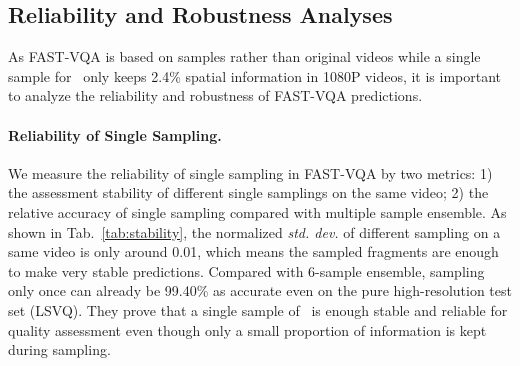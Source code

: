 \documentclass[runningheads]{llncs}
\begin{document}
\subsection{Reliability and Robustness Analyses}

As FAST-VQA is based on samples rather than original videos while a single sample for \frag~only keeps 2.4\% spatial information in 1080P videos, it is important to analyze the reliability and robustness of FAST-VQA predictions.

\paragraph{Reliability of Single Sampling.} We measure the reliability of single sampling in FAST-VQA by two metrics: 1) the assessment stability of different single samplings on the same video; 2) the relative accuracy of single sampling compared with multiple sample ensemble. As shown in Tab.~\ref{tab:stability}, the normalized \textit{std. dev.} of different sampling on a same video is only around 0.01, which means the sampled fragments are enough to make very stable predictions. Compared with 6-sample ensemble, sampling only once can already be 99.40\% as accurate even on the pure high-resolution test set (LSVQ). They prove that a single sample of \frag~is enough stable and reliable for quality assessment even though only a small proportion of information is kept during sampling.

\begin{table}
\center
\setlength\tabcolsep{6pt}
\renewcommand\arraystretch{1.15}
\footnotesize
\vspace{-18pt}
\caption{Assessment stability and relative accuracy of single sampling of \frag.} 
\label{tab:stability}
\vspace{-20pt}
\end{table}
\end{document}

